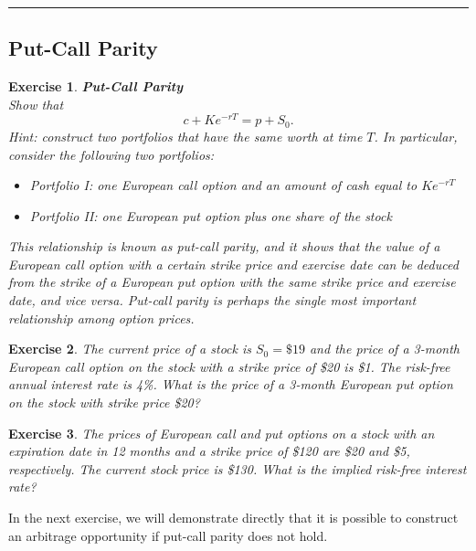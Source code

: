 \documentclass[letterpaper,10pt]{article}
\newtheorem{ex}{Exercise}
\begin{document}
\bigskip

\hrule

\bigskip

\subsection{Put-Call Parity}




\begin{ex}{\bf Put-Call Parity}\\
Show that $$c+Ke^{-rT}=p+S_0.$$  Hint:  construct two portfolios that have the same worth at time $T$.  In particular, consider the following two portfolios:

\begin{itemize}

\item Portfolio I:  one European call option and an amount of cash equal to $Ke^{-rT}$

\item Portfolio II:  one European put option plus one share of the stock

\end{itemize}

This relationship is known as {\em put-call parity}, and it shows that the value of a European call option with a certain strike price and exercise date can be deduced from the strike of a European put option with the same strike price and exercise date, and vice versa.  Put-call parity is perhaps the single most important relationship among option prices.
\end{ex}

\begin{ex}
The current price of a stock is $S_0=\$19$ and the price of a 3-month European call option on the stock with a strike price of \$20 is \$1.  The risk-free annual interest rate is 4\%.  What is the price of a 3-month European put option on the stock with strike price \$20?  
\end{ex}

\begin{ex}
The prices of European call and put options on a stock with an expiration date in 12 months and a strike price of \$120 are \$20 and \$5, respectively. The current stock price is \$130. What is the implied risk-free interest rate?
\end{ex}

\noindent In the next exercise, we will demonstrate directly that it is possible to construct an arbitrage opportunity if put-call parity does not hold.
\end{document}
